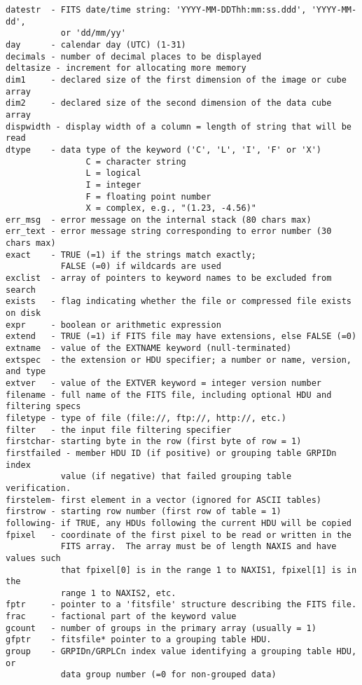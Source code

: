 \documentclass[11pt]{book}
\begin{document}
\begin{verbatim}
datestr  - FITS date/time string: 'YYYY-MM-DDThh:mm:ss.ddd', 'YYYY-MM-dd',
           or 'dd/mm/yy'
day      - calendar day (UTC) (1-31)
decimals - number of decimal places to be displayed
deltasize - increment for allocating more memory
dim1     - declared size of the first dimension of the image or cube array
dim2     - declared size of the second dimension of the data cube array
dispwidth - display width of a column = length of string that will be read
dtype    - data type of the keyword ('C', 'L', 'I', 'F' or 'X')
                C = character string
                L = logical
                I = integer
                F = floating point number
                X = complex, e.g., "(1.23, -4.56)"
err_msg  - error message on the internal stack (80 chars max)
err_text - error message string corresponding to error number (30 chars max)
exact    - TRUE (=1) if the strings match exactly;
           FALSE (=0) if wildcards are used
exclist  - array of pointers to keyword names to be excluded from search
exists   - flag indicating whether the file or compressed file exists on disk
expr     - boolean or arithmetic expression
extend   - TRUE (=1) if FITS file may have extensions, else FALSE (=0)
extname  - value of the EXTNAME keyword (null-terminated)
extspec  - the extension or HDU specifier; a number or name, version, and type
extver   - value of the EXTVER keyword = integer version number
filename - full name of the FITS file, including optional HDU and filtering specs
filetype - type of file (file://, ftp://, http://, etc.)
filter   - the input file filtering specifier
firstchar- starting byte in the row (first byte of row = 1)
firstfailed - member HDU ID (if positive) or grouping table GRPIDn index
           value (if negative) that failed grouping table verification.
firstelem- first element in a vector (ignored for ASCII tables)
firstrow - starting row number (first row of table = 1)
following- if TRUE, any HDUs following the current HDU will be copied
fpixel   - coordinate of the first pixel to be read or written in the
           FITS array.  The array must be of length NAXIS and have values such
           that fpixel[0] is in the range 1 to NAXIS1, fpixel[1] is in the
           range 1 to NAXIS2, etc.
fptr     - pointer to a 'fitsfile' structure describing the FITS file.
frac     - factional part of the keyword value
gcount   - number of groups in the primary array (usually = 1)
gfptr    - fitsfile* pointer to a grouping table HDU.
group    - GRPIDn/GRPLCn index value identifying a grouping table HDU, or
           data group number (=0 for non-grouped data)

\end{verbatim}
\end{document}
